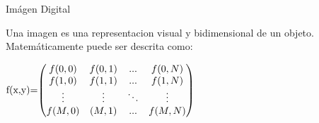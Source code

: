\documentclass{beamer}
\begin{document}
\begin{frame}{Imágen Digital}

Una imagen es una representacion visual y bidimensional de un objeto. Matemáticamente puede ser descrita como:

\begin{center}
\begin{math}
	\centering
	$f(x,y)=$
   \begin{pmatrix} 
    f(0,0) & f(0,1) & ... & f(0,N) \\ 
 	f(1,0) & f(1,1) & ... & f(1,N) \\
    \vdots & \vdots & \ddots & \vdots \\

    f(M,0) & (M,1) & ... & f(M,N) \\
   \end{pmatrix}
\end{math}\\
\end{center}


\end{frame}
\end{document}
